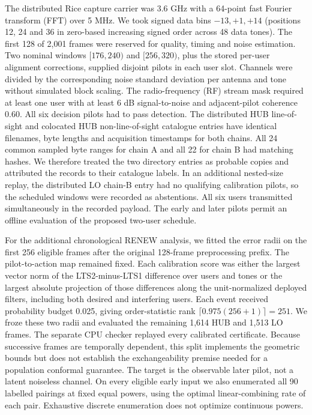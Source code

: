\documentclass[lineno,pdflatex,sn-nature]{sn-jnl}
\begin{document}
The distributed Rice capture carrier was 3.6 GHz with a 64-point fast Fourier transform (FFT) over 5 MHz. We took signed data bins \(-13,+1,+14\) (positions 12, 24 and 36 in zero-based increasing signed order across 48 data tones). The first 128 of 2,001 frames were reserved for quality, timing and noise estimation. Two nominal windows \([176,240)\) and \([256,320)\), plus the stored per-user alignment corrections, supplied disjoint pilots in each user slot. Channels were divided by the corresponding noise standard deviation per antenna and tone without simulated block scaling. The radio-frequency (RF) stream mask required at least one user with at least 6 dB signal-to-noise and adjacent-pilot coherence 0.60. All six decision pilots had to pass detection. The distributed HUB line-of-sight and colocated HUB non-line-of-sight catalogue entries have identical filenames, byte lengths and acquisition timestamps for both chains. All 24 common sampled byte ranges for chain A and all 22 for chain B had matching hashes. We therefore treated the two directory entries as probable copies and attributed the records to their catalogue labels. In an additional nested-size replay, the distributed LO chain-B entry had no qualifying calibration pilots, so the scheduled windows were recorded as abstentions. All six users transmitted simultaneously in the recorded payload. The early and later pilots permit an offline evaluation of the proposed two-user schedule.

For the additional chronological RENEW analysis, we fitted the error radii on the first 256 eligible frames after the original 128-frame preprocessing prefix. The pilot-to-action map remained fixed. Each calibration score was either the largest vector norm of the LTS2-minus-LTS1 difference over users and tones or the largest absolute projection of those differences along the unit-normalized deployed filters, including both desired and interfering users. Each event received probability budget 0.025, giving order-statistic rank $\lceil0.975(256+1)\rceil=251$. We froze these two radii and evaluated the remaining 1,614 HUB and 1,513 LO frames. The separate CPU checker replayed every calibrated certificate. Because successive frames are temporally dependent, this split implements the geometric bounds but does not establish the exchangeability premise needed for a population conformal guarantee. The target is the observable later pilot, not a latent noiseless channel. On every eligible early input we also enumerated all 90 labelled pairings at fixed equal powers, using the optimal linear-combining rate of each pair. Exhaustive discrete enumeration does not optimize continuous powers.
\end{document}
